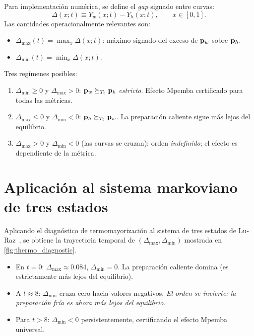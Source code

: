Para implementación numérica, se define el \emph{gap} signado entre curvas:
\begin{equation}
    \Delta(x; t) \equiv Y_{w}(x; t) - Y_{h}(x; t), \qquad x \in [0, 1].
\end{equation}
%
Las cantidades operacionalmente relevantes son:
\begin{itemize}
\item $\Delta_{\max}(t) = \max_{x} \Delta(x; t)$: máximo signado del exceso de 
$\vb{p}_w$ sobre $\vb{p}_h$.
\item $\Delta_{\min}(t) = \min_{x} \Delta(x; t)$.
\end{itemize}

\noindent Tres regímenes posibles:
\begin{enumerate}
\item $\Delta_{\min} \geq 0$ y $\Delta_{\max} > 0$: $\vb{p}_w \succeq_{T_{b}} \vb{p}_h$ 
\emph{estricto}. Efecto Mpemba certificado para todas las métricas.
\item $\Delta_{\max} \leq 0$ y $\Delta_{\min} < 0$: $\vb{p}_h \succeq_{T_{b}} \vb{p}_w$. 
La preparación caliente sigue más lejos del equilibrio.
\item $\Delta_{\max} > 0$ y $\Delta_{\min} < 0$ (las curvas se cruzan): orden 
\emph{indefinido}; el efecto es dependiente de la métrica.
\end{enumerate}

\section{Aplicación al sistema markoviano de tres estados}

Aplicando el diagnóstico de termomayorización al sistema de tres estados de 
Lu-Raz~\cite{lu2017}, se obtiene la trayectoria temporal de 
$(\Delta_{\max}, \Delta_{\min})$ mostrada en \cref{fig:thermo_diagnostic}.

\begin{itemize}
\item En $t = 0$: $\Delta_{\max} \approx 0.084$, $\Delta_{\min} = 0$. La 
preparación caliente domina (es estrictamente más lejos del equilibrio).
\item A $t \approx 8$: $\Delta_{\min}$ cruza cero hacia valores negativos. 
\emph{El orden se invierte: la preparación fría es ahora más lejos del 
equilibrio.}
\item Para $t > 8$: $\Delta_{\min} < 0$ persistentemente, certificando el 
efecto Mpemba universal.
\end{itemize}


